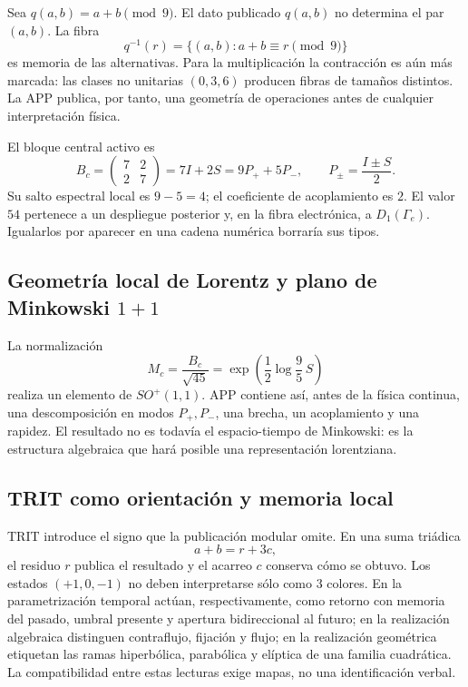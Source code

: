 Sea \(q(a,b)=a+b\pmod 9\). El dato publicado \(q(a,b)\) no determina el par
\((a,b)\). La fibra
\[
 q^{-1}(r)=\{(a,b):a+b\equiv r\pmod9\}
\]
es memoria de las alternativas. Para la multiplicación la contracción es aún
más marcada: las clases no unitarias \((0,3,6)\) producen fibras de tamaños
distintos. La APP publica, por tanto, una geometría de operaciones antes de
cualquier interpretación física.

El bloque central activo es
\[
B_c=\begin{pmatrix}7&2\\2&7\end{pmatrix}
   =7I+2S=9P_++5P_-,
\qquad
P_\pm=\frac{I\pm S}{2}.
\]
Su salto espectral local es \(9-5=4\); el coeficiente de acoplamiento es \(2\).
El valor \(54\) pertenece a un despliegue posterior y, en la fibra electrónica,
a \(D_1(\Gamma_e)\). Igualarlos por aparecer en una cadena numérica borraría
sus tipos.

\subsection{Geometría local de Lorentz y plano de Minkowski \texorpdfstring{\(1+1\)}{1+1}}

La normalización
\[
M_c=\frac{B_c}{\sqrt{45}}
=\exp\!\left(\frac12\log\frac95\,S\right)
\]
realiza un elemento de \(SO^+(1,1)\). APP contiene así, antes de la física
continua, una descomposición en modos \(P_+,P_-\), una brecha, un acoplamiento
y una rapidez. El resultado no es todavía el espacio-tiempo de Minkowski: es
la estructura algebraica que hará posible una representación lorentziana.

\subsection{TRIT como orientación y memoria local}

TRIT introduce el signo que la publicación modular omite. En una suma triádica
\[
 a+b=r+3c,
\]
el residuo \(r\) publica el resultado y el acarreo \(c\) conserva cómo se
obtuvo. Los estados \((+1,0,-1)\) no deben interpretarse sólo como \(3\)
colores. En la parametrización temporal actúan, respectivamente, como
retorno con memoria del pasado, umbral presente y apertura bidireccional al futuro;
en la realización algebraica distinguen contraflujo, fijación y flujo; en la
realización geométrica etiquetan las ramas hiperbólica, parabólica y elíptica
de una familia cuadrática. La compatibilidad entre estas lecturas exige mapas,
no una identificación verbal.

